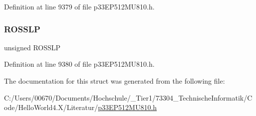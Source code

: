 Definition at line 9379 of file p33\+E\+P512\+M\+U810.\+h.

\mbox{\label{structtag_r_e_f_o_c_o_n_b_i_t_s_abcb605b9611f8a753739bf72e369a591}} 
\subsubsection{\texorpdfstring{R\+O\+S\+S\+LP}{ROSSLP}}
{\footnotesize\ttfamily unsigned R\+O\+S\+S\+LP}



Definition at line 9380 of file p33\+E\+P512\+M\+U810.\+h.



The documentation for this struct was generated from the following file\+:\begin{DoxyCompactItemize}
\item 
C\+:/\+Users/00670/\+Documents/\+Hochschule/\+\_\+\+Tier1/73304\+\_\+\+Technische\+Informatik/\+Code/\+Hello\+World4.\+X/\+Literatur/\hyperlink{p33_e_p512_m_u810_8h}{p33\+E\+P512\+M\+U810.\+h}\end{DoxyCompactItemize}

